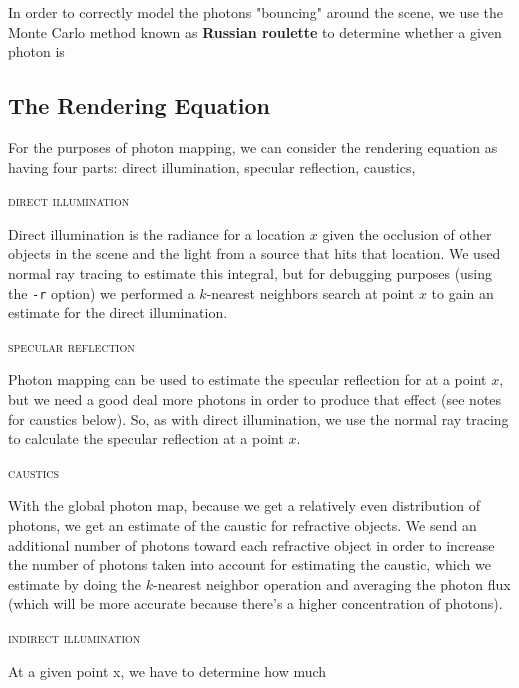 \documentclass{article}
\begin{document}
In order to correctly model the photons "bouncing" around the scene, we use the Monte Carlo method known as {\bf Russian roulette} to determine whether a given photon is 

\subsection{The Rendering Equation} %
\label{sub:the_rendering_equation}
For the purposes of photon mapping, we can consider the rendering equation as having four parts: direct illumination, specular reflection, caustics, 

\begin{center}\textsc{direct illumination}\end{center} 

Direct illumination is the radiance for a location $x$ given the occlusion of other objects in the scene and the light from a source that hits that location. We used normal ray tracing to estimate this integral, but for debugging purposes (using the \verb+-r+ option) we performed a $k$-nearest neighbors search at point $x$ to gain an estimate for the direct illumination.

\begin{center}\textsc{specular reflection}\end{center} 
Photon mapping can be used to estimate the specular reflection for at a point $x$, but we need a good deal more photons in order to produce that effect (see notes for caustics below). So, as with direct illumination, we use the normal ray tracing to calculate the specular reflection at a point $x$.

\begin{center}\textsc{caustics}\end{center} 
With the global photon map, because we get a relatively even distribution of photons, we get an estimate of the caustic for refractive objects. We send an additional number of photons toward each refractive object in order to increase the number of photons taken into account for estimating the caustic, which we estimate by doing the $k$-nearest neighbor operation and averaging the photon flux (which will be more accurate because there's a higher concentration of photons).

\begin{center}\textsc{indirect illumination}\end{center} 
At a given point x, we have to determine how much 

	

\end{document}

